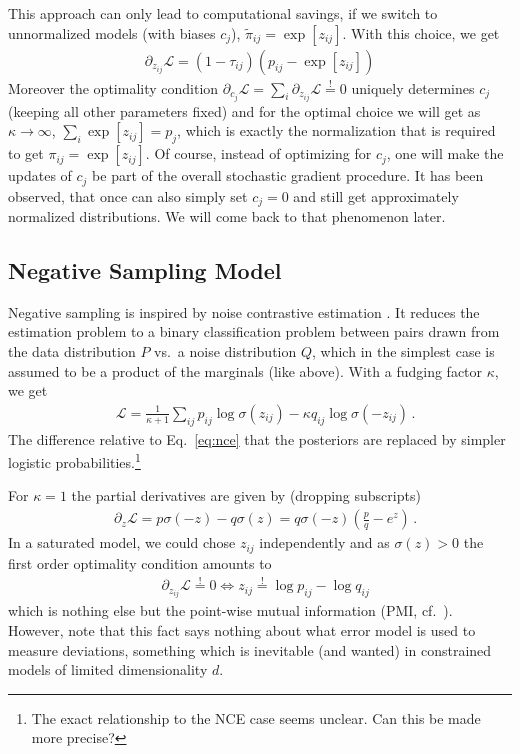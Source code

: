 \documentclass{article}
\newcommand{\logl}{{\mathcal L}}
\begin{document}
This approach can only lead to computational savings, if we switch to unnormalized models (with biases $c_j$), $\tilde \pi_{ij} = \exp[z_{ij}]$. With this choice, we get 
\begin{align}
\partial_{z_{ij}} \logl = (1-\tau_{ij}) \left( p_{ij} -\exp[z_{ij}] \right)
\label{nce:unnorm}
\end{align}
Moreover the optimality condition $\partial_{c_j} \logl = \sum_{i} \partial_{z_{ij}} \logl \stackrel != 0$
 uniquely determines $c_j$ (keeping all other parameters fixed) and for the optimal choice we will get as $\kappa \to \infty$, $\sum_i \exp[z_{ij}] = p_j$, which is exactly the normalization that is required to get $\pi_{ij} = \exp[z_{ij}]$. Of course, instead of optimizing for $c_j$, one will make the updates of $c_j$ be part of the overall stochastic gradient procedure. It has been observed, that once can also simply set $c_j=0$ and still get approximately normalized distributions. We will come back to that phenomenon later. 


\subsection{Negative Sampling Model} 

Negative sampling is inspired by noise contrastive estimation \cite{}. It reduces the estimation problem to a binary classification problem between pairs drawn from the data distribution $P$ vs.~a noise distribution $Q$, which in the simplest case is assumed to be a product of the marginals (like above).  With a fudging factor $\kappa$, we get
\begin{align}
& \logl =  \frac{1}{\kappa+1} \sum_{ij} p_{ij} \log \sigma(z_{ij}) -  \kappa q_{ij} \log \sigma(-z_{ij}) \,. 
\end{align}
The difference relative to Eq.~\eqref{eq:nce} that the posteriors are replaced by simpler logistic probabilities.\footnote{The exact relationship to the NCE case seems unclear. Can this be made more precise?}

For $\kappa=1$ the partial derivatives are given by (dropping subscripts)
\begin{align}
& \partial_{z} \logl = p \sigma(-z) - q \sigma(z)
= q \sigma(-z) \left( \frac p q  - e^z  \right)\,.
\end{align}
In a saturated model, we could chose $z_{ij}$ independently and as $\sigma(z)>0$ the first order optimality condition amounts to
\begin{align}
& \partial_{z_{ij}} \logl \stackrel !=0 \iff z_{ij} \stackrel != \log p_{ij} - \log q_{ij}
\label{eq:pmi-optimal}
\end{align}
which is nothing else but the point-wise mutual information (PMI, cf.~\cite{levy2014neural}). However, note that this fact  says nothing about what error model is used to measure deviations, something which is inevitable (and wanted) in constrained models of limited dimensionality $d$. 
\end{document}

